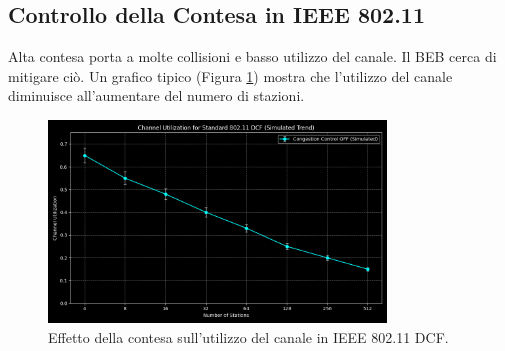 \subsection{Controllo della Contesa in IEEE 802.11}
Alta contesa porta a molte collisioni e basso utilizzo del canale. Il BEB cerca di mitigare ciò.
Un grafico tipico (Figura \ref{fig:contention_control}) mostra che l'utilizzo del canale diminuisce all'aumentare del numero di stazioni.

\begin{figure}[H]
\centering
\includegraphics[width=0.8\textwidth]{images/contention_control.png}
\caption{Effetto della contesa sull'utilizzo del canale in IEEE 802.11 DCF.}
\label{fig:contention_control}
\end{figure}

